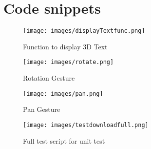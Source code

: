 \appendix
\label{appendix}

\chapter{Code snippets}
\doublespacing

\begin{figure}[!htp]
	\centering
	\texttt{[image: images/displayTextfunc.png]}
	\caption{Function to display 3D Text}
	\label{fig:displayTextfunc}
\end{figure}

\begin{figure}[!htp]
	\centering
	\texttt{[image: images/rotate.png]}
	\caption{Rotation Gesture}
	\label{fig:rotate}
\end{figure}

\begin{figure}[!htp]
	\centering
	\texttt{[image: images/pan.png]}
	\caption{Pan Gesture}
	\label{fig:pan}
\end{figure}

\begin{figure}[!htp]
	\centering
	\texttt{[image: images/testdownloadfull.png]}
	\caption{Full test script for unit test}
	\label{fig:testdownloadfull}
\end{figure}